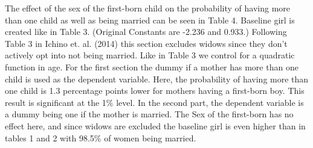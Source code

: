 \documentclass[12pt,draft,a4paper]{article}
\begin{document}
The effect of the sex of the first-born child on the probability of having more than one child as well as being married can be seen in Table 4. 
Baseline girl is created like in Table 3. (Original Constants are -2.236 and 0.933.) 
Following Table 3 in Ichino et. al. (2014) this section excludes widows since they don't actively opt into not being married. 
Like in Table 3 we control for a quadratic function in age. For the first section the dummy if a mother has more than one child is used as the dependent variable. 
Here, the probability of having more than one child is 1.3 percentage points lower for mothers having a first-born boy. 
This result is significant at the 1\% level. In the second part, the dependent variable is a dummy being one if the mother is married. 
The Sex of the first-born has no effect here, and since widows are excluded the baseline girl is even higher than in tables 1 and 2 with 98.5\% of women being married.
\end{document}
